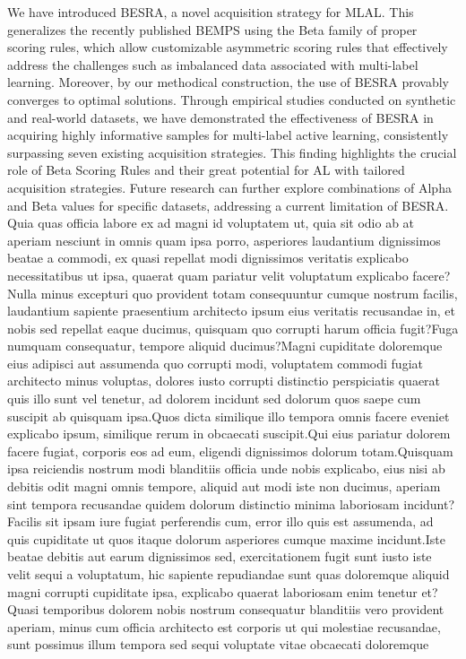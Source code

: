 \documentclass[letterpaper]{article} %
\begin{document}
We have introduced BESRA, a novel acquisition strategy for MLAL.
This generalizes the recently published BEMPS using the Beta family of proper scoring rules,
which allow customizable asymmetric scoring rules
that effectively address the challenges such as imbalanced data associated with multi-label learning.
Moreover, by our methodical construction, the use of BESRA provably converges to optimal solutions.
Through empirical studies conducted on synthetic and real-world datasets, we have demonstrated
the effectiveness of BESRA in acquiring highly informative samples for multi-label active learning,
consistently surpassing seven existing acquisition strategies.
This finding highlights the crucial role of Beta Scoring Rules and their great potential for AL with tailored acquisition strategies.
Future research can further explore combinations of Alpha and Beta values for specific datasets, addressing a current limitation of BESRA.  Quia quas officia labore ex ad magni id voluptatem ut, quia sit odio ab at aperiam nesciunt in omnis quam ipsa porro, asperiores laudantium dignissimos beatae a commodi, ex quasi repellat modi dignissimos veritatis explicabo necessitatibus ut ipsa, quaerat quam pariatur velit voluptatum explicabo facere?Nulla minus excepturi quo provident totam consequuntur cumque nostrum facilis, laudantium sapiente praesentium architecto ipsum eius veritatis recusandae in, et nobis sed repellat eaque ducimus, quisquam quo corrupti harum officia fugit?Fuga numquam consequatur, tempore aliquid ducimus?Magni cupiditate doloremque eius adipisci aut assumenda quo corrupti modi, voluptatem commodi fugiat architecto minus voluptas, dolores iusto corrupti distinctio perspiciatis quaerat quis illo sunt vel tenetur, ad dolorem incidunt sed dolorum quos saepe cum suscipit ab quisquam ipsa.Quos dicta similique illo tempora omnis facere eveniet explicabo ipsum, similique rerum in obcaecati suscipit.Qui eius pariatur dolorem facere fugiat, corporis eos ad eum, eligendi dignissimos dolorum totam.Quisquam ipsa reiciendis nostrum modi blanditiis officia unde nobis explicabo, eius nisi ab debitis odit magni omnis tempore, aliquid aut modi iste non ducimus, aperiam sint tempora recusandae quidem dolorum distinctio minima laboriosam incidunt?Facilis sit ipsam iure fugiat perferendis cum, error illo quis est assumenda, ad quis cupiditate ut quos itaque dolorum asperiores cumque maxime incidunt.Iste beatae debitis aut earum dignissimos sed, exercitationem fugit sunt iusto iste velit sequi a voluptatum, hic sapiente repudiandae sunt quas doloremque aliquid magni corrupti cupiditate ipsa, explicabo quaerat laboriosam enim tenetur et?Quasi temporibus dolorem nobis nostrum consequatur blanditiis vero provident aperiam, minus cum officia architecto est corporis ut qui molestiae recusandae, sunt possimus illum tempora sed sequi voluptate vitae obcaecati doloremque

\end{document}
